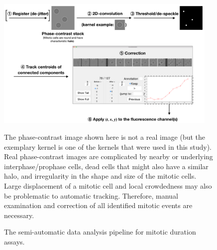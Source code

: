 \begin{figure}
    \centering
    \includegraphics[width=0.95\textwidth]{chapters/figures/DataAnalysisPipeline.pdf}
    \caption{The semi-automatic data analysis pipeline for mitotic duration assays.}
    \noindent \justifying The phase-contrast image shown here is not a real image (but the exemplary kernel is one of the kernels that were used in this study). Real phase-contrast images are complicated by nearby or underlying interphase/prophase cells, dead cells that might also have a similar halo, and irregularity in the shape and size of the mitotic cells. Large displacement of a mitotic cell and local crowdedness may also be problematic to automatic tracking. Therefore, manual examination and correction of all identified mitotic events are necessary.
    \label{DataAnalysisPipeline}
\end{figure}

